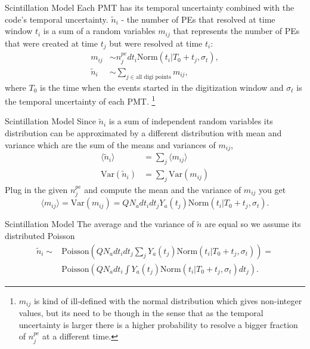 \documentclass{beamer}
\newcommand\blfootnote[1]{%
  \begingroup
  \renewcommand\thefootnote{}\footnote{#1}%
  \addtocounter{footnote}{-1}%
  \endgroup
}
\begin{document}
\begin{frame}{Scintillation Model}
Each PMT has its temporal uncertainty combined with the code's temporal uncertainty. $\tilde{n}_i$ - the number of PEs that resolved at time window $t_i$ is a sum of a random variables $m_{ij}$ that represents the number of PEs that were created at time $t_j$ but were resolved at time $t_i$:
\begin{equation}
\begin{split}
m_{ij}&\sim n^{pe}_jdt_i\text{Norm}(t_i|T_0+t_j, \sigma_t),\\
\tilde{n}_i&\sim\sum_{j\in\text{all digi points}}m_{ij},
\end{split}
\end{equation}
where $T_0$ is the time when the events started in the digitization window and $\sigma_t$ is the temporal uncertainty of each PMT.
\blfootnote{$m_{ij}$ is kind of ill-defined with the normal distribution which gives non-integer values, but its need to be though in the sense that as the temporal uncertainty is larger there is a higher probability to resolve a bigger fraction of $n_j^{pe}$ at a different time.}
\end{frame}

\begin{frame}{Scintillation Model}
Since $\tilde{n}_i$ is a sum of independent random variables its distribution can be approximated by a different distribution with mean and variance which are the sum of the means and variances of $m_{ij}$,
\begin{equation}
\begin{split}
\langle\tilde{n}_i\rangle&=\sum_j\langle m_{ij}\rangle\\
\text{Var}(\tilde{n}_i)&=\sum_j\text{Var}(m_{ij})
\end{split}
\end{equation}
Plug in the given $n_j^{pe}$ and compute the mean and the variance of $m_{ij}$ you get
\begin{equation}
\langle m_{ij}\rangle=\text{Var}(m_{ij})=QN_adt_idt_jY_a(t_j)\text{Norm}(t_i|T_0+t_j, \sigma_t).
\end{equation}
\end{frame}

\begin{frame}{Scintillation Model}
The average and the variance of $\tilde{n}$ are equal so we assume its distributed Poisson
\begin{equation}
\begin{split}
\tilde{n}_i\sim&\text{Poisson}\left(QN_adt_idt_j\sum_jY_a(t_j)\text{Norm}(t_i|T_0+t_j, \sigma_t)\right)=\\
&\text{Poisson}\left(QN_adt_i\int Y_a(t_j)\text{Norm}(t_i|T_0+t_j, \sigma_t)dt_j\right).
\end{split}
\end{equation}
\end{frame}
\end{document}

